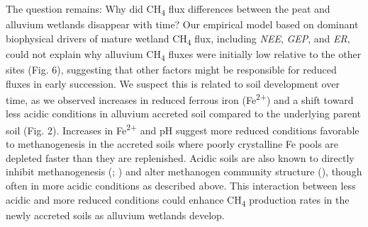 \documentclass[
  12pt,
]{article}
\begin{document}
The question remains: Why did CH\textsubscript{4} flux differences
between the peat and alluvium wetlands disappear with time? Our
empirical model based on dominant biophysical drivers of mature wetland
CH\textsubscript{4} flux, including \emph{NEE}, \emph{GEP}, and
\emph{ER}, could not explain why alluvium CH\textsubscript{4} fluxes
were initially low relative to the other sites (Fig. 6), suggesting that
other factors might be responsible for reduced fluxes in early
succession. We suspect this is related to soil development over time, as
we observed increases in reduced ferrous iron (Fe\textsuperscript{2+})
and a shift toward less acidic conditions in alluvium accreted soil
compared to the underlying parent soil (Fig. 2). Increases in
Fe\textsuperscript{2+} and pH suggest more reduced conditions favorable
to methanogenesis in the accreted soils where poorly crystalline Fe
pools are depleted faster than they are replenished. Acidic soils are
also known to directly inhibit methanogenesis
(;
) and alter methanogen
community structure (), though often in more acidic conditions as
described above. This interaction between less acidic and more reduced
conditions could enhance CH\textsubscript{4} production rates in the
newly accreted soils as alluvium wetlands develop.
\end{document}
